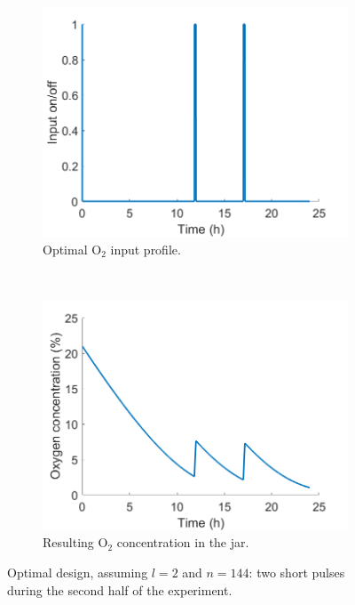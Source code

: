 \begin{figure}
	\centering
	\begin{subfigure}[b]{0.45\textwidth}
		\includegraphics[width=\textwidth]{figure/paper 1/input2.png}
		\caption{Optimal $\text{O}_2$ input profile.}
		\label{input2}
	\end{subfigure}
	~ %
	\begin{subfigure}[b]{0.45\textwidth}
		\includegraphics[width=\textwidth]{figure/paper 1/design2.png}
		\caption{Resulting $\text{O}_2$ concentration in the jar.}
		\label{output2}
	\end{subfigure}
	\caption{Optimal design, assuming $l=2$ and $n=144$: two short pulses during the second half of the experiment.}
	\label{figODE2}
\end{figure}
